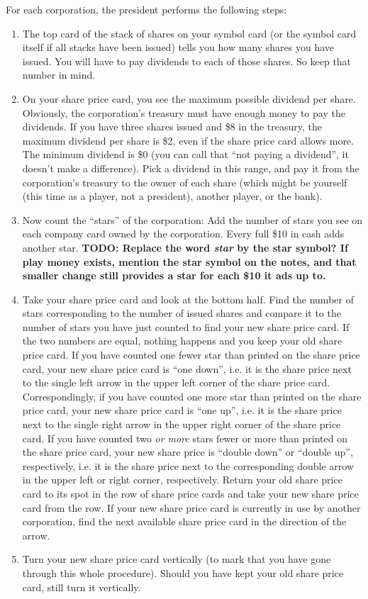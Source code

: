 \documentclass[10pt,final]{report}
\begin{document}
\begin{multicols}{2}
For each corporation, the president performs the following steps:
\begin{enumerate}
\item The top card of the stack of shares on your symbol card (or the
  symbol card itself if all stacks have been issued) tells you how
  many shares you have issued. You will have to pay dividends to each
  of those shares. So keep that number in mind.
\item On your share price card, you see the maximum possible dividend
  per share. Obviously, the corporation's treasury must have enough
  money to pay the dividends. If you have three shares issued and \$8
  in the treasury, the maximum dividend per share is \$2, even if the
  share price card allows more. The minimum dividend is \$0 (you can
  call that ``not paying a dividend'', it doesn't make a
  difference). Pick a dividend in this range, and pay it from the
  corporation's treasury to the owner of each share (which might be
  yourself (this time as a player, not a president), another player,
  or the bank).
\item Now count the ``stars'' of the corporation: Add the
  number of stars you see on each company card owned by the
  corporation. Every full \$10 in cash adds another
  star. \textbf{TODO: Replace the word \emph{star} by the star symbol?
    If play money exists, mention the star symbol on the notes, and
    that smaller change still provides a star for each \$10 it ads up to.}
\item Take your share price card and look at the bottom half. Find the
  number of stars corresponding to the number of issued shares and
  compare it to the number of stars you have just counted to find your
  new share price card. If the two numbers are equal, nothing happens
  and you keep your old share price card. If you have counted one
  fewer star than printed on the share price card, your new share
  price card is ``one down'', i.e. it is the share price next to the
  single left arrow in the upper left corner of the share price
  card. Correspondingly, if you have counted one more star than
  printed on the share price card, your new share price card is ``one
  up'', i.e. it is the share price next to the single right arrow in
  the upper right corner of the share price card. If you have counted
  two \emph{or more} stars fewer or more than printed on the share
  price card, your new share price is ``double down'' or ``double
  up'', respectively, i.e. it is the share price next to the
  corresponding double arrow in the upper left or right corner,
  respectively. Return your old share price card to its spot in the
  row of share price cards and take your new share price card from the
  row. If your new share price card is currently in use by another
  corporation, find the next available share price card in the
  direction of the arrow.
\item Turn your new share price card vertically (to mark that you have
  gone through this whole procedure). Should you have kept your old
  share price card, still turn it vertically.
\end{enumerate}


\end{multicols}
\end{document}
